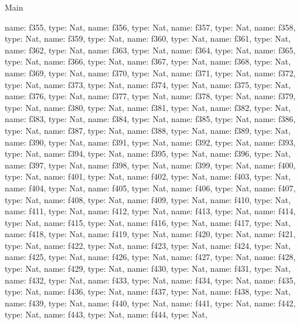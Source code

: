 \begin{lexlean}{Main}
\begin{semanticmodule}
{    {name: f355, type: Nat},
    {name: f356, type: Nat},
    {name: f357, type: Nat},
    {name: f358, type: Nat},
    {name: f359, type: Nat},
    {name: f360, type: Nat},
    {name: f361, type: Nat},
    {name: f362, type: Nat},
    {name: f363, type: Nat},
    {name: f364, type: Nat},
    {name: f365, type: Nat},
    {name: f366, type: Nat},
    {name: f367, type: Nat},
    {name: f368, type: Nat},
    {name: f369, type: Nat},
    {name: f370, type: Nat},
    {name: f371, type: Nat},
    {name: f372, type: Nat},
    {name: f373, type: Nat},
    {name: f374, type: Nat},
    {name: f375, type: Nat},
    {name: f376, type: Nat},
    {name: f377, type: Nat},
    {name: f378, type: Nat},
    {name: f379, type: Nat},
    {name: f380, type: Nat},
    {name: f381, type: Nat},
    {name: f382, type: Nat},
    {name: f383, type: Nat},
    {name: f384, type: Nat},
    {name: f385, type: Nat},
    {name: f386, type: Nat},
    {name: f387, type: Nat},
    {name: f388, type: Nat},
    {name: f389, type: Nat},
    {name: f390, type: Nat},
    {name: f391, type: Nat},
    {name: f392, type: Nat},
    {name: f393, type: Nat},
    {name: f394, type: Nat},
    {name: f395, type: Nat},
    {name: f396, type: Nat},
    {name: f397, type: Nat},
    {name: f398, type: Nat},
    {name: f399, type: Nat},
    {name: f400, type: Nat},
    {name: f401, type: Nat},
    {name: f402, type: Nat},
    {name: f403, type: Nat},
    {name: f404, type: Nat},
    {name: f405, type: Nat},
    {name: f406, type: Nat},
    {name: f407, type: Nat},
    {name: f408, type: Nat},
    {name: f409, type: Nat},
    {name: f410, type: Nat},
    {name: f411, type: Nat},
    {name: f412, type: Nat},
    {name: f413, type: Nat},
    {name: f414, type: Nat},
    {name: f415, type: Nat},
    {name: f416, type: Nat},
    {name: f417, type: Nat},
    {name: f418, type: Nat},
    {name: f419, type: Nat},
    {name: f420, type: Nat},
    {name: f421, type: Nat},
    {name: f422, type: Nat},
    {name: f423, type: Nat},
    {name: f424, type: Nat},
    {name: f425, type: Nat},
    {name: f426, type: Nat},
    {name: f427, type: Nat},
    {name: f428, type: Nat},
    {name: f429, type: Nat},
    {name: f430, type: Nat},
    {name: f431, type: Nat},
    {name: f432, type: Nat},
    {name: f433, type: Nat},
    {name: f434, type: Nat},
    {name: f435, type: Nat},
    {name: f436, type: Nat},
    {name: f437, type: Nat},
    {name: f438, type: Nat},
    {name: f439, type: Nat},
    {name: f440, type: Nat},
    {name: f441, type: Nat},
    {name: f442, type: Nat},
    {name: f443, type: Nat},
    {name: f444, type: Nat},
}
\end{semanticmodule}
\end{lexlean}
